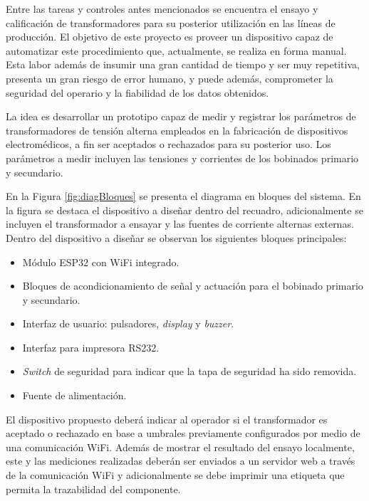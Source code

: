 \documentclass[11pt]{charter}
\begin{document}
Entre las tareas y controles antes mencionados se encuentra el ensayo y calificación de  transformadores para su posterior utilización en las líneas de producción. El objetivo de este proyecto es proveer un dispositivo capaz de automatizar este procedimiento que, actualmente, se realiza en forma manual. Esta labor además de insumir una gran cantidad de tiempo y ser muy repetitiva, presenta un gran riesgo de error humano, y puede además, comprometer la seguridad del operario y la fiabilidad de los datos obtenidos.

La idea es desarrollar un prototipo capaz de medir y registrar los parámetros de transformadores de tensión alterna empleados en la fabricación de dispositivos electromédicos, a fin ser aceptados o rechazados para su posterior uso. Los parámetros a medir incluyen las tensiones y corrientes de los bobinados primario y secundario.

En la Figura \ref{fig:diagBloques} se presenta el diagrama en bloques del sistema. En la figura se destaca el dispositivo a diseñar dentro del recuadro, adicionalmente se incluyen el transformador a ensayar y las fuentes de corriente alternas externas. Dentro del dispositivo a diseñar se observan los siguientes bloques principales:

\begin{itemize}
\item Módulo ESP32 con WiFi integrado.
\item Bloques de acondicionamiento de señal y actuación para el bobinado primario y secundario.
\item Interfaz de usuario: pulsadores, \textit{display} y \textit{buzzer}.
\item Interfaz para impresora RS232.
\item \textit{Switch} de seguridad para indicar que la tapa de seguridad ha sido removida.
\item Fuente de alimentación.
\end{itemize}

El dispositivo propuesto deberá indicar al operador si el transformador es aceptado o rechazado en base a umbrales previamente configurados por medio de una comunicación WiFi. Además de mostrar el resultado del ensayo localmente, este y las mediciones realizadas deberán ser enviados a un servidor web a través de la comunicación WiFi y adicionalmente se debe imprimir una etiqueta que permita la trazabilidad del componente.
\end{document}
